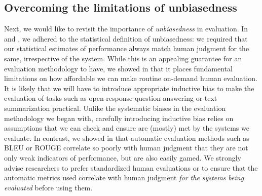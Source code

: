 
\subsection{Overcoming the limitations of unbiasedness}

Next, we would like to revisit the importance of \textit{unbiasedness} in evaluation.
In  and , we adhered to the statistical definition of unbiasedness: we required that our statistical estimates of performance always match human judgment for the same, irrespective of the system.
While this is an appealing guarantee for an evaluation methodology to have, we showed in  that it places fundamental limitations on how affordable we can make routine on-demand human evaluation.
It is likely that we will have to introduce appropriate inductive bias to make the evaluation of tasks such as open-response question answering or text summarization practical.
Unlike the systematic biases in the evaluation methodology we began with, carefully introducing inductive bias relies on assumptions that we can check and ensure are (mostly) met by the systems we evaluate.
In contrast, we showed in  that automatic evaluation methods such as BLEU or ROUGE correlate so poorly with human judgment that they are not only weak indicators of performance, but are also easily gamed.
We strongly advise researchers to prefer standardized human evaluations or to ensure that the automatic metrics used correlate with human judgment \textit{for the systems being evaluated} before using them.

